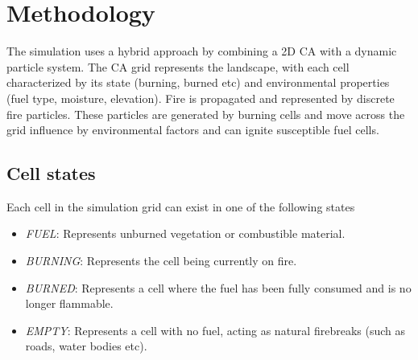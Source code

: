 \section{Methodology}
The simulation uses a hybrid approach by combining a 2D CA with a dynamic particle system. The CA grid represents the landscape, with each cell characterized by its state (burning, burned etc) and environmental properties (fuel type, moisture, elevation). Fire is propagated and represented by discrete fire particles. These particles are generated by burning cells and move across the grid influence by environmental factors and can ignite susceptible fuel cells.

\subsection{Cell states}
Each cell in the simulation grid can exist in one of the following states
\begin{itemize}
	\item \textit{FUEL}: Represents unburned vegetation or combustible material.
	\item \textit{BURNING}: Represents the cell being currently on fire.
	\item \textit{BURNED}: Represents a cell where the fuel has been fully consumed and is no longer flammable.
	\item \textit{EMPTY}: Represents a cell with no fuel, acting as natural firebreaks (such as roads, water bodies etc).
\end{itemize}
